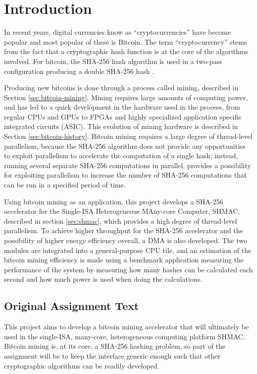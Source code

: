 \chapter{Introduction}

In recent years, digital currencies know as ``cryptocurrencies'' have become popular
and most popular of these is Bitcoin. The term ``cryptocurrency'' stems from the fact
that a cryptographic hash function is at the core of the algorithms involved. For bitcoin,
the SHA-256 hash algorithm is used in a two-pass configuration producing a double SHA-256
hash \cite{bitcoin}.

Producing new bitcoins is done through a process called mining, described in Section \ref{sec:bitcoin-mining}.
Mining requires large amounts of computing power, and has led to a quick development in
the hardware used in the process, from regular CPUs and GPUs to FPGAs and highly specialized application specific
integrated circuits (ASIC). This evolution of mining hardware is described in Section \ref{sec:bitcoin-history}.
Bitcoin mining requires a large degree of thread-level parallelism, because the SHA-256
algorithm does not provide any opportunities to exploit parallelism to accelerate the
computation of a single hash; instead, running several separate SHA-256 computations in parallel,
provides a possibility for exploiting parallelism to increase the number of SHA-256 computations
that can be run in a specified period of time.

Using bitcoin mining as an application, this project develops a SHA-256 accelerator
for the Single-ISA Heterogeneous MAny-core Computer, SHMAC, described in section \ref{sec:shmac},
which provides a high degree of thread-level parallelism. To achieve higher throughput for the
SHA-256 accelerator and the possibility of higher energy efficiency overall, a DMA is also
developed. The two modules are integrated into a general-purpose CPU tile, and an estimation
of the bitcoin mining efficiency is made using a benchmark application measuring the performance
of the system by measuring how many hashes can be calculated each second and how much power
is used when doing the calculations.

\section{Original Assignment Text}

This project aims to develop a bitcoin mining accelerator that will ultimately be
used in the single-ISA, many-core, heterogeneous computing platform SHMAC. Bitcoin
mining is, at its core, a SHA-256 hashing problem, so part of the assignment will
be to keep the interface generic enough such that other cryptographic algorithms
can be readily developed.

